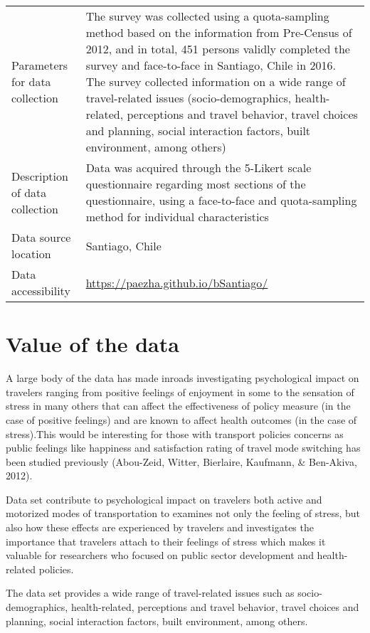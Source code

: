 \documentclass[
11pt, %
oneside, %
english, %
singlespacing, %
]{macthesis} %
\begin{document}
\begin{longtable}[]{@{}
  >{\raggedright\arraybackslash}p{}
  >{\raggedright\arraybackslash}p{}@{}}
Parameters for data collection & The survey was collected using a quota-sampling method based on the information from Pre-Census of 2012, and in total, 451 persons validly completed the survey and face-to-face in Santiago, Chile in 2016. The survey collected information on a wide range of travel-related issues (socio-demographics, health-related, perceptions and travel behavior, travel choices and planning, social interaction factors, built environment, among others) \\
Description of data collection & Data was acquired through the 5-Likert scale questionnaire regarding most sections of the questionnaire, using a face-to-face and quota-sampling method for individual characteristics \\
Data source location & Santiago, Chile \\
Data accessibility & \url{https://paezha.github.io/bSantiago/} \\
\end{longtable}
\hypertarget{value-of-the-data}{%
\section{Value of the data}\label{value-of-the-data}}

A large body of the data has made inroads investigating psychological impact on travelers ranging from positive feelings of enjoyment in some to the sensation of stress in many others that can affect the effectiveness of policy measure (in the case of positive feelings) and are known to affect health outcomes (in the case of stress).This would be interesting for those with transport policies concerns as public feelings like happiness and satisfaction rating of travel mode switching has been studied previously (Abou-Zeid, Witter, Bierlaire, Kaufmann, \& Ben-Akiva, 2012).

Data set contribute to psychological impact on travelers both active and motorized modes of transportation to examines not only the feeling of stress, but also how these effects are experienced by travelers and investigates the importance that travelers attach to their feelings of stress which makes it valuable for researchers who focused on public sector development and health-related policies.

The data set provides a wide range of travel-related issues such as socio-demographics, health-related, perceptions and travel behavior, travel choices and planning, social interaction factors, built environment, among others.
\end{document}
